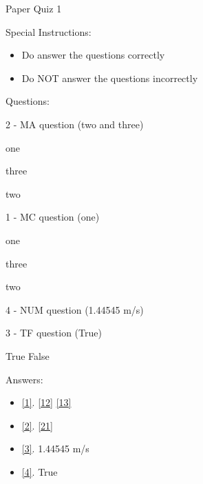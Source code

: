 \documentclass[letterpaper,10pt]{article}
\begin{document}
\begin{center}
{\Large Paper Quiz 1}
\end{center}

Special Instructions:
\begin{itemize}
    \item Do answer the questions correctly
    \item Do NOT answer the questions incorrectly
\end{itemize}
\vspace{10pt}
Questions:
\vspace{10pt}

\begin{compactenum} 
\begin{minipage}{\linewidth}
    \item \label{1} 2 - MA question (two and three)
    \begin{compactenum} 
        \item \label{11} one
        \item \label{12} three
        \item \label{13} two
    \end{compactenum}
    
    \end{minipage}

    \vspace{10pt}

\begin{minipage}{\linewidth}
    \item \label{2} 1 - MC question (one)
    \begin{compactenum} 
        \item \label{21} one
        \item \label{22} three
        \item \label{23} two
    \end{compactenum}
    
    \end{minipage}

    \vspace{10pt}

\begin{minipage}{\linewidth}
    \item \label{3} 4 - NUM question (1.44545 m/s)
    
    \end{minipage}

    \vspace{10pt}

\begin{minipage}{\linewidth}
    \item \label{4} 3 - TF question (True)

        True \hskip 1cm False
    
    \end{minipage}

    \vspace{10pt}

\end{compactenum}

\clearpage
Answers:
\begin{itemize}
      \item \ref{1}.
            \ref{12} 
            \ref{13} 
      \item \ref{2}.
            \ref{21} 
      \item \ref{3}.
            1.44545 m/s 
      \item \ref{4}.
            True 

\end{itemize}
\end{document}
